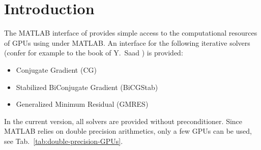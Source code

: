 
\chapter*{Introduction}   

The MATLAB interface of {\ViennaCL} provides simple access to the computational resources of GPUs using {\ViennaCL} under MATLAB.
An interface for the following iterative solvers (confer for example to the book of Y.~Saad \cite{saad-iterative-solution}) is provided:
\begin{itemize}
 \item Conjugate Gradient (CG)
 \item Stabilized BiConjugate Gradient (BiCGStab)
 \item Generalized Minimum Residual (GMRES)
\end{itemize}
In the current version, all solvers are provided without preconditioner. Since MATLAB relies on double precision arithmetics, only a few GPUs can be used, see Tab.~\ref{tab:double-precision-GPUs}.



